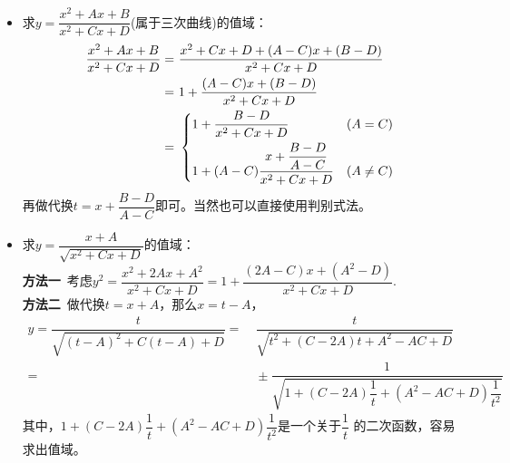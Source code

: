 \begin{itemize}[leftmargin=\inteval{\myitemleftmargin}pt,itemsep=
   \inteval{\myitemitempsep}pt,topsep=\inteval{\myitemtopsep}pt]
\item 求$ y=\dfrac{x^2+Ax+B}{x^2+Cx+D} $(属于三次曲线)的值域：
\begin{align*}
    \dfrac{x^2+Ax+B}{x^2+Cx+D} =&\  \dfrac{x^2+Cx+D+(A-C)x+(B-D)}{x^2+Cx+D} \\
    =&\ 1+\dfrac{(A-C)x+(B-D)}{x^2+Cx+D}  \\
    =&\ \begin{dcases}
         1+\dfrac{B-D}{x^2+Cx+D} & (A = C) \\
         1+(A-C)\dfrac{x+\dfrac{B-D}{A-C}}{x^2+Cx+D} & (A\neq C)
    \end{dcases}
\end{align*}
再做代换$ t=x+\dfrac{B-D}{A-C} $即可。当然也可以直接使用判别式法。

\item 求$ y=\dfrac{x+A}{\sqrt{x^2+Cx+D}} $的值域：\\
\textbf{方法一}\ 考虑$ y^2=\dfrac{x^2+2Ax+A^2}{x^2+Cx+D}
=1+\dfrac{(2A-C)x+(A^2-D)}{x^2+Cx+D} $. \\
\textbf{方法二}\ 做代换$ t=x+A $，那么$ x=t-A $，
\begin{align*}
    y=\dfrac{t}{\sqrt{(t-A)^2+C(t-A)+D}}=&\ \dfrac{t}{\sqrt{t^2+(C-2A)t+A^2-AC+D}} \\
    =&\  \pm \dfrac{1}{\sqrt{1+(C-2A)\dfrac{1}{t}+(A^2-AC+D)\dfrac{1}{t^2}}}
\end{align*}
其中，$ 1+(C-2A)\dfrac{1}{t}+(A^2-AC+D)\dfrac{1}{t^2} $是一个关于$ \dfrac{1}{t} $
的二次函数，容易求出值域。


\end{itemize}
